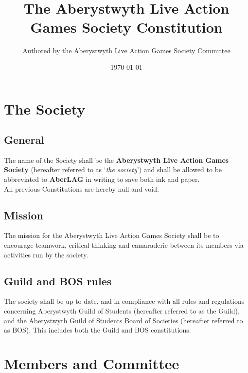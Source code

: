 \documentclass{report}
\newcommand{\society}{Aberystwyth Live Action Games Society}
\begin{document}
\title{The \society{} Constitution}
\author{Authored by the \society{} Committee}
\date{\today}
\maketitle{}

\tableofcontents
\newpage

\chapter{The Society}

\section{General}

The name of the Society shall be the \textbf{\society} (hereafter referred to as `{\em the society}') and shall be allowed to be abbreviated to \textbf{AberLAG} in writing to save both ink and paper. \\

\noindent All previous Constitutions are hereby null and void.

\section{Mission}

The mission for the \society{} shall be to encourage teamwork, critical thinking and camaraderie between its members via activities run by the society.

\section{Guild and BOS rules}

The society shall be up to date, and in compliance with all rules and regulations concerning Aberystwyth Guild of Students (hereafter referred to as the Guild), and the Aberystwyth Guild of Students Board of Societies (hereafter referred to as BOS). This includes both the Guild and BOS constitutions.

\chapter{Members and Committee}
\end{document}
